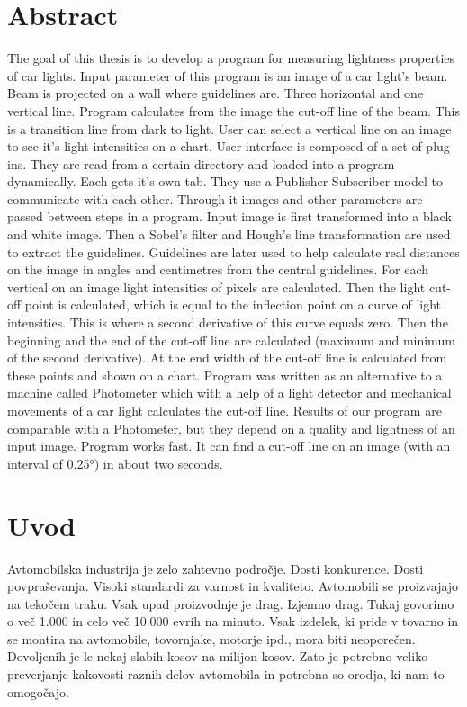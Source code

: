 \documentclass[oneside, a4paper, 12pt]{book}
\newcommand{\clearemptydoublepage}{\newpage{\pagestyle{empty}\cleardoublepage}}
\begin{document}
\chapter*{Abstract}

The goal of this thesis is to develop a program for measuring lightness properties of car lights. Input parameter of this program is an image of a car light's beam. Beam is projected on a wall where guidelines are. Three horizontal and one vertical line. Program calculates from the image the cut-off line of the beam. This is a transition line from dark to light. User can select a vertical line on an image to see it's light intensities on a chart. User interface is composed of a set of plug-ins. They are read from a certain directory and loaded into a program dynamically. Each gets it's own tab. They use a Publisher-Subscriber model to communicate with each other. Through it images and other parameters are passed between steps in a program. Input image is first transformed into a black and white image. Then a Sobel's filter and Hough's line transformation are used to extract the guidelines. Guidelines are later used to help calculate real distances on the image in angles and centimetres from the central guidelines. For each vertical on an image light intensities of pixels are calculated. Then the light cut-off point is calculated, which is equal to the inflection point on a curve of light intensities. This is where a second derivative of this curve equals zero. Then the beginning and the end of the cut-off line are calculated (maximum and minimum of the second derivative). At the end width of the cut-off line is calculated from these points and shown on a chart. Program was written as an alternative to a machine called Photometer which with a help of a light detector and mechanical movements of a car light calculates the cut-off line. Results of our program are comparable with a Photometer, but they depend on a quality and lightness of an input image. Program works fast. It can find a cut-off line on an image (with an interval of 0.25°) in about two seconds.

\clearemptydoublepage

\mainmatter
\setcounter{page}{1}
\pagestyle{fancy}

\chapter{Uvod}
Avtomobilska industrija je zelo zahtevno področje. Dosti konkurence. Dosti povpraševanja. Visoki standardi za varnost in kvaliteto. Avtomobili se proizvajajo na tekočem traku. Vsak upad proizvodnje je drag. Izjemno drag. Tukaj govorimo o več 1.000 in celo več 10.000 evrih na minuto. Vsak izdelek, ki pride v tovarno in se montira na avtomobile, tovornjake, motorje ipd., mora biti neoporečen. Dovoljenih je le nekaj slabih kosov na milijon kosov. Zato je potrebno veliko preverjanje kakovosti raznih delov avtomobila in potrebna so orodja, ki nam to omogočajo.
\end{document}
